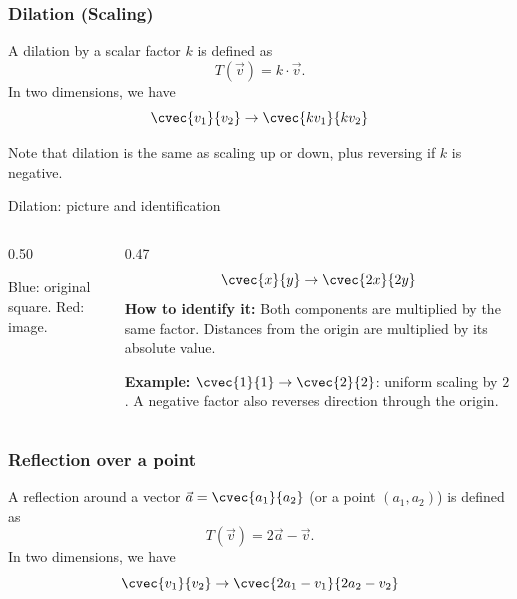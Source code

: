 \begin{frame}
\frametitle{Dilation (Scaling)}
\begin{defn}{}{}
A dilation by a scalar factor $k$ is defined as
\[ T(\vec{v}) = k \cdot \vec{v}.\]
In two dimensions, we have
\[ \cvec{v_1}{v_2} \to \cvec{kv_1}{kv_2}\]
\end{defn}
Note that dilation is the same as scaling up or down, plus reversing if $k$ is negative.
\end{frame}

\begin{frame}{Dilation: picture and identification}
\begin{columns}[T]
\begin{column}{0.50\textwidth}
\centering
{}

\small Blue: original square. Red: image.
\end{column}
\begin{column}{0.47\textwidth}
\small
\[ \cvec{x}{y}\to\cvec{2x}{2y} \]
\textbf{How to identify it:} Both components are multiplied by the same factor. Distances from the origin are multiplied by its absolute value.

\medskip
\textbf{Example:} $\cvec{1}{1}\to\cvec{2}{2}$: uniform scaling by $2$. A negative factor also reverses direction through the origin.
\end{column}
\end{columns}
\end{frame}


\begin{frame}
\frametitle{Reflection over a point}
\begin{defn}{}{}
A reflection around a vector $\vec{a} = \cvec{a_1}{a_2}$ (or a point $(a_1, a_2)$) is defined as
\[ T(\vec{v}) = 2\vec{a} - \vec{v}.\]
In two dimensions, we have
\[ \cvec{v_1}{v_2} \to \cvec{2a_1-v_1}{2a_2-v_2}\]
\end{defn}
\end{frame}

